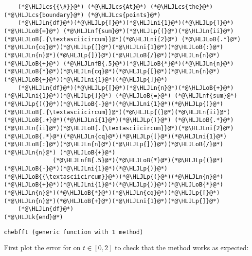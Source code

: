 \documentclass[12pt,a4paper]{article}
\newcommand{\HLJLk}[1]{\textcolor[RGB]{148,91,176}{\textbf{#1}}}
\newcommand{\HLJLn}[1]{#1}
\newcommand{\HLJLnf}[1]{\textcolor[RGB]{66,102,213}{#1}}
\newcommand{\HLJLnfB}[1]{\textcolor[RGB]{59,151,46}{#1}}
\newcommand{\HLJLni}[1]{\textcolor[RGB]{59,151,46}{#1}}
\newcommand{\HLJLoB}[1]{\textcolor[RGB]{102,102,102}{\textbf{#1}}}
\newcommand{\HLJLp}[1]{#1}
\newcommand{\HLJLcs}[1]{\textcolor[RGB]{153,153,119}{\textit{#1}}}
\begin{document}
\begin{lstlisting}
    (*@\HLJLcs{{\#}}@*) (*@\HLJLcs{At}@*) (*@\HLJLcs{the}@*) (*@\HLJLcs{boundary}@*) (*@\HLJLcs{points}@*)
    (*@\HLJLn{df}@*)(*@\HLJLp{[}@*)(*@\HLJLni{1}@*)(*@\HLJLp{]}@*) (*@\HLJLoB{=}@*) (*@\HLJLnf{sum}@*)(*@\HLJLp{(}@*)(*@\HLJLn{ii}@*)(*@\HLJLoB{.{\textasciicircum}}@*)(*@\HLJLni{2}@*) (*@\HLJLoB{.*}@*)(*@\HLJLn{cq}@*)(*@\HLJLp{[}@*)(*@\HLJLni{1}@*)(*@\HLJLoB{:}@*)(*@\HLJLn{n}@*)(*@\HLJLp{])}@*)(*@\HLJLoB{/}@*)(*@\HLJLn{n}@*) (*@\HLJLoB{+}@*) (*@\HLJLnfB{.5}@*)(*@\HLJLoB{*}@*)(*@\HLJLn{n}@*)(*@\HLJLoB{*}@*)(*@\HLJLn{cq}@*)(*@\HLJLp{[}@*)(*@\HLJLn{n}@*)(*@\HLJLoB{+}@*)(*@\HLJLni{1}@*)(*@\HLJLp{]}@*)     
    (*@\HLJLn{df}@*)(*@\HLJLp{[}@*)(*@\HLJLn{n}@*)(*@\HLJLoB{+}@*)(*@\HLJLni{1}@*)(*@\HLJLp{]}@*) (*@\HLJLoB{=}@*) (*@\HLJLnf{sum}@*)(*@\HLJLp{((}@*)(*@\HLJLoB{-}@*)(*@\HLJLni{1}@*)(*@\HLJLp{)}@*) (*@\HLJLoB{.{\textasciicircum}}@*)(*@\HLJLp{(}@*)(*@\HLJLn{ii}@*) (*@\HLJLoB{.+}@*)(*@\HLJLni{1}@*)(*@\HLJLp{)}@*) (*@\HLJLoB{.*}@*) (*@\HLJLn{ii}@*)(*@\HLJLoB{.{\textasciicircum}}@*)(*@\HLJLni{2}@*) (*@\HLJLoB{.*}@*)(*@\HLJLn{cq}@*)(*@\HLJLp{[}@*)(*@\HLJLni{1}@*)(*@\HLJLoB{:}@*)(*@\HLJLn{n}@*)(*@\HLJLp{])}@*)(*@\HLJLoB{/}@*)(*@\HLJLn{n}@*) (*@\HLJLoB{+}@*)
              (*@\HLJLnfB{.5}@*)(*@\HLJLoB{*}@*)(*@\HLJLp{(}@*)(*@\HLJLoB{-}@*)(*@\HLJLni{1}@*)(*@\HLJLp{)}@*)(*@\HLJLoB{{\textasciicircum}}@*)(*@\HLJLp{(}@*)(*@\HLJLn{n}@*)(*@\HLJLoB{+}@*)(*@\HLJLni{1}@*)(*@\HLJLp{)}@*)(*@\HLJLoB{*}@*)(*@\HLJLn{n}@*)(*@\HLJLoB{*}@*)(*@\HLJLn{cq}@*)(*@\HLJLp{[}@*)(*@\HLJLn{n}@*)(*@\HLJLoB{+}@*)(*@\HLJLni{1}@*)(*@\HLJLp{]}@*)
    (*@\HLJLn{df}@*)
(*@\HLJLk{end}@*)
\end{lstlisting}

\begin{lstlisting}
chebfft (generic function with 1 method)
\end{lstlisting}


First plot the error for on $t \in [0,2]$ to check that the method works as expected:
\end{document}

